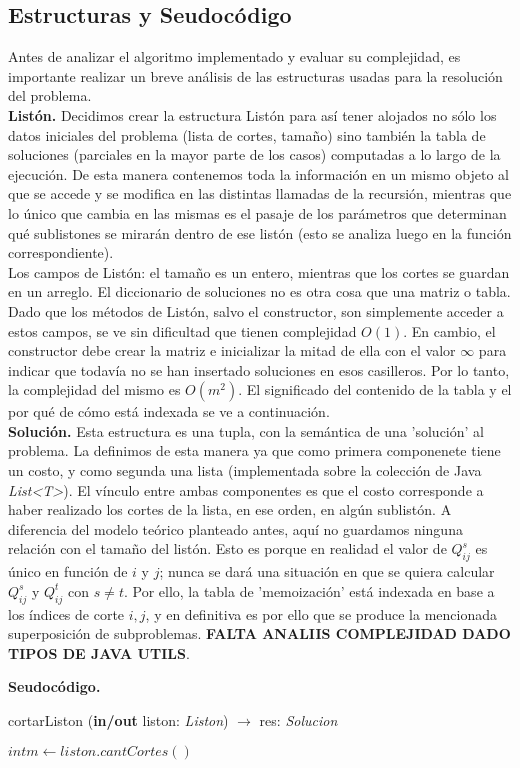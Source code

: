 \subsection{Estructuras y Seudocódigo}

Antes de analizar el algoritmo implementado y evaluar su complejidad, es importante realizar un breve análisis de las estructuras usadas para la resolución del problema.\\

\textbf{Listón.} Decidimos crear la estructura Listón para así tener alojados no sólo los datos iniciales del problema (lista de cortes, tamaño) sino también la tabla de soluciones (parciales en la mayor parte de los casos) computadas a lo largo de la ejecución. De esta manera contenemos toda la información en un mismo objeto al que se accede y se modifica en las distintas llamadas de la recursión, mientras que lo único que cambia en las mismas es el pasaje de los parámetros que determinan qué sublistones se mirarán dentro de ese listón (esto se analiza luego en la función correspondiente).\\
\indent Los campos de Listón: el tamaño es un entero, mientras que los cortes se guardan en un arreglo. El diccionario de soluciones no es otra cosa que una matriz o tabla. Dado que los métodos de Listón, salvo el constructor, son simplemente acceder a estos campos, se ve sin dificultad que tienen complejidad $O(1)$. En cambio, el constructor debe crear la matriz e inicializar la mitad de ella con el valor $\infty$ para indicar que todavía no se han insertado soluciones en esos casilleros. Por lo tanto, la complejidad del mismo es $O(m^2)$. El significado del contenido de la tabla y el por qué de cómo está indexada se ve a continuación.\\

\textbf{Solución.} Esta estructura es una tupla, con la semántica de una 'solución' al problema. La definimos de esta manera ya que como primera componenete tiene un costo, y como segunda una lista (implementada sobre la colección de Java \textsl{List<T>}). El vínculo entre ambas componentes es que el costo corresponde a haber realizado los cortes de la lista, en ese orden, en algún sublistón. A diferencia del modelo teórico planteado antes, aquí no guardamos ninguna relación con el tamaño del listón. Esto es porque en realidad el valor de $Q^{s}_{ij}$ es único en función de $i$ y $j$; nunca se dará una situación en que se quiera calcular $Q^{s}_{ij}$ y $Q^{t}_{ij}$ con $ s \neq t$. Por ello, la tabla de 'memoización' está indexada en base a los índices de corte $i,j$, y en definitiva es por ello que se produce la mencionada superposición de subproblemas. \textbf{FALTA ANALIIS COMPLEJIDAD DADO TIPOS DE JAVA UTILS}.

\textbf{Seudocódigo.}

\begin{algorithm}
\caption{cortarListon (\textbf{in/out} liston: \textsl{Liston}) $\rightarrow$ res: \textsl{Solucion}}
\begin{algorithmic}

\STATE $int m \leftarrow liston.cantCortes()$

\end{algorithmic}
\end{algorithm}
	
